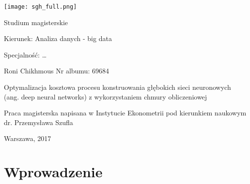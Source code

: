 \documentclass[12pt,a4paper,twoside]{article}
\begin{document}
\begin{center}

  \texttt{[image: sgh\_full.png]}

  \vspace{1cm}
  Studium magisterskie

\end{center}

\vspace{1cm}

\noindent Kierunek: Analiza danych - big data

\noindent Specjalność: \dots

\vspace{1cm}

{
\leftskip=10cm\noindent
Roni Chikhmous\newline
Nr albumu: 69684

}

\vspace{2cm}

\begin{center}
  \LARGE
  Optymalizacja kosztowa procesu konstruowania głębokich sieci neuronowych (ang. deep neural networks) z wykorzystaniem chmury obliczeniowej
\end{center}

\vspace{1cm}

{
\leftskip=10cm\noindent
Praca magisterska napisana\newline
w Instytucie Ekonometrii\newline
pod kierunkiem naukowym\newline
dr. Przemysława Szufla

}

\vfill

\begin{center}
Warszawa, 2017
\end{center}
\thispagestyle{empty}

\clearpage
\thispagestyle{empty}
\mbox{}

\clearpage

\tableofcontents

\clearpage

\section{Wprowadzenie}

\end{document}
